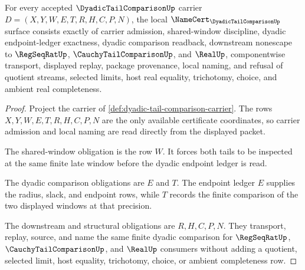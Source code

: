 \begin{theorem}
\label{thm:dyadic-tail-comparison-namecert-obligations}
For every accepted $\DyadicTailComparisonUp$ carrier $D=(X,Y,W,E,T,R,H,C,P,N)$, the local $\NameCert_{\DyadicTailComparisonUp}$ surface consists exactly of carrier admission, shared-window discipline, dyadic endpoint-ledger exactness, dyadic comparison readback, downstream nonescape to $\RegSeqRatUp$, $\CauchyTailComparisonUp$, and $\RealUp$, componentwise transport, displayed replay, package provenance, local naming, and refusal of quotient streams, selected limits, host real equality, trichotomy, choice, and ambient real completeness.
\end{theorem}
\begin{proof}
Project the carrier of \autoref{def:dyadic-tail-comparison-carrier}. The rows $X,Y,W,E,T,R,H,C,P,N$ are the only available certificate coordinates, so carrier admission and local naming are read directly from the displayed packet.

The shared-window obligation is the row $W$. It forces both tails to be inspected at the same finite late window before the dyadic endpoint ledger is read.

The dyadic comparison obligations are $E$ and $T$. The endpoint ledger $E$ supplies the radius, slack, and endpoint rows, while $T$ records the finite comparison of the two displayed windows at that precision.

The downstream and structural obligations are $R,H,C,P,N$. They transport, replay, source, and name the same finite dyadic comparison for $\RegSeqRatUp$, $\CauchyTailComparisonUp$, and $\RealUp$ consumers without adding a quotient, selected limit, host equality, trichotomy, choice, or ambient completeness row.
\end{proof}

